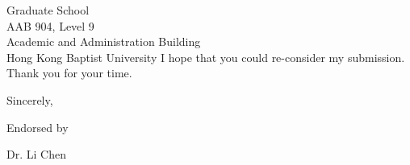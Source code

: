 \documentclass[10pt]{letter} %
\begin{document}
\begin{letter}{Graduate School \\ AAB 904, Level 9 \\ Academic and Administration Building \\ Hong Kong Baptist University}
I hope that you could re-consider my submission. Thank you for your time.

\vspace{2\parskip} %
\closing{Sincerely,}
\vspace{2\parskip} %

Endorsed by

\vspace{2\parskip} %
\vspace{2\parskip} %

Dr. Li Chen




\end{letter}
 
\end{document}
